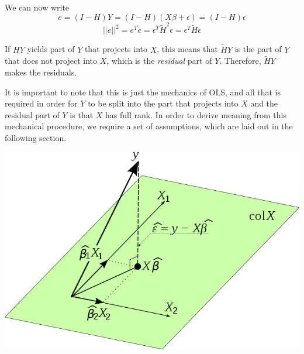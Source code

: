 \documentclass[12pt]{article}
\begin{document}
We can now write
\[ e = (I - H)Y = (I - H)(X\beta + \epsilon) = (I - H)\epsilon \]
\[ ||e||^2 = e^{T}e = \epsilon^{T}\tilde{H}^2\epsilon = \epsilon^{T}\tilde{H}\epsilon \]

If $HY$ yields part of $Y$ that projects into $X$, this means that $\tilde{H}Y$ is the part of $Y$ that does not project into $X$, which is the \emph{residual} part of $Y$.  Therefore, $\tilde{H}Y$ makes the residuals.

It is important to note that this is just the mechanics of OLS, and all that is required in order for $Y$ to be split into the part that projects into $X$ and the residual part of $Y$ is that $X$ has full rank.  In order to derive meaning from this mechanical procedure, we require a set of assumptions, which are laid out in the following section.

\begin{center}
\includegraphics[scale = 0.3]{proj.png}
\end{center}

\end{document}
